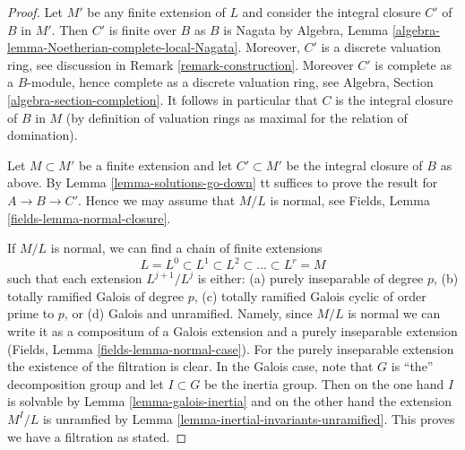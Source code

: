 \begin{proof}
Let $M'$ be any finite extension of $L$ and consider the integral closure
$C'$ of $B$ in $M'$. Then $C'$ is finite over $B$ as $B$ is Nagata by
Algebra, Lemma \ref{algebra-lemma-Noetherian-complete-local-Nagata}.
Moreover, $C'$ is a discrete valuation ring, see discussion in
Remark \ref{remark-construction}. Moreover $C'$ is complete as a
$B$-module, hence complete as a discrete valuation ring, see
Algebra, Section \ref{algebra-section-completion}.
It follows in particular that $C$ is the integral
closure of $B$ in $M$ (by definition of valuation rings as maximal
for the relation of domination).

\medskip\noindent
Let $M \subset M'$ be a finite extension and let $C' \subset M'$
be the integral closure of $B$ as above. By
Lemma \ref{lemma-solutions-go-down}
tt suffices to prove the result for $A \to B \to C'$.
Hence we may assume that $M/L$ is normal, see
Fields, Lemma \ref{fields-lemma-normal-closure}.

\medskip\noindent
If $M / L$ is normal, we can find a chain of finite extensions
$$
L = L^0 \subset L^1 \subset L^2 \subset \ldots \subset L^r = M
$$
such that each extension $L^{j + 1}/L^j$ is either: (a) purely
inseparable of degree $p$, (b) totally ramified Galois of degree $p$, (c)
totally ramified Galois cyclic of order prime to $p$, or
(d) Galois and unramified.
Namely, since $M/L$ is normal we can write it as a compositum of
a Galois extension and a purely inseparable extension
(Fields, Lemma \ref{fields-lemma-normal-case}).
For the purely inseparable extension the existence of the filtration
is clear. In the Galois case, note that $G$ is ``the'' decomposition group
and let $I \subset G$ be the inertia group. Then on the one hand
$I$ is solvable by Lemma \ref{lemma-galois-inertia} and on the other
hand the extension $M^I/L$ is unramfied by
Lemma \ref{lemma-inertial-invariants-unramified}.
This proves we have a filtration as stated.


\end{proof}
